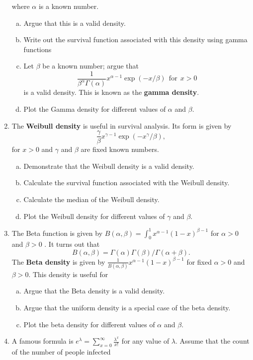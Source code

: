 \documentclass[12pt]{article}
\begin{document}
\begin{enumerate}[1.]
$$	$$
	where $\alpha$ is a known number.
	\begin{enumerate}[a.] 
	\item Argue that this is a valid density.
	\item Write out the survival function associated with this density using gamma functions
    \item Let $\beta$ be a known number; argue that
    $$
	\frac{1}{\beta^\alpha\Gamma(\alpha)} x^{\alpha - 1} \exp(-x/\beta) ~~ \mbox{for} ~~ x > 0    
    $$ 	
    is a valid density. This is known as the {\bf gamma density}.
	\item Plot the Gamma density for different values of $\alpha$ and $\beta$.
	\end{enumerate}
\item The {\bf Weibull density} is useful in survival analysis. Its form is given by 
$$
\frac{\gamma}{\beta}x^{\gamma - 1}\exp\left(-x^\gamma / \beta\right),
$$
for $x > 0$ and $\gamma$ and $\beta$ are fixed known numbers.
\begin{enumerate}[a.]
	\item Demonstrate that the Weibull density is a valid density.
	\item Calculate the survival function associated with the Weibull density.
	\item Calculate the median of the Weibull density.
	\item Plot the Weibull density for different values of $\gamma$ and $\beta$.
\end{enumerate}
\item The Beta function is given by $B(\alpha, \beta) =  \int_0^1 x^{\alpha-1} (1 - x)^{\beta - 1}$
for $\alpha > 0$ and $\beta > 0$ . It turns out that 
$$
B(\alpha, \beta) = \Gamma(\alpha)\Gamma(\beta)/\Gamma(\alpha + \beta).
$$
The {\bf Beta density} is given by $\frac{1}{B(\alpha,\beta)}x^{\alpha-1}(1 - x)^{\beta-1}$ for fixed 
$\alpha > 0$ and $\beta > 0$. This density is useful for 
\begin{enumerate}[a.]
\item Argue that the Beta density is a valid density.
\item Argue that the uniform density is a special case of the beta density.
\item Plot the beta density for different values of $\alpha$ and $\beta$.
\end{enumerate}
\item A famous formula is $e^{\lambda} = \sum_{x=0}^\infty \frac{\lambda^{x}}{x!}$ for any value
	of $\lambda$. Assume that the count of the number of people infected

\end{enumerate}
\end{document}
